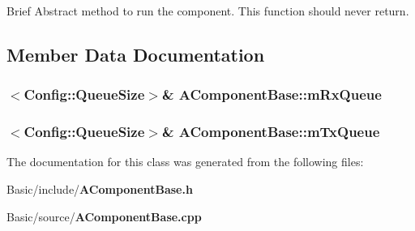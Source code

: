 Brief Abstract method to run the component. This function should never return. 



\subsection{Member Data Documentation}
\subsubsection[{m\-Rx\-Queue}]{$<${\bf Config\-::\-Queue\-Size}$>$\& A\-Component\-Base\-::m\-Rx\-Queue\hspace{0.3cm}{\ttfamily [protected]}}\label{classAComponentBase_aa245688230760f423572ce06388fdf0f}
\subsubsection[{m\-Tx\-Queue}]{$<${\bf Config\-::\-Queue\-Size}$>$\& A\-Component\-Base\-::m\-Tx\-Queue\hspace{0.3cm}{\ttfamily [protected]}}\label{classAComponentBase_a7119bbb290dae26369754405ba78e2a0}


The documentation for this class was generated from the following files\-:\begin{DoxyCompactItemize}
\item 
Basic/include/{\bf A\-Component\-Base.\-h}\item 
Basic/source/{\bf A\-Component\-Base.\-cpp}\end{DoxyCompactItemize}
